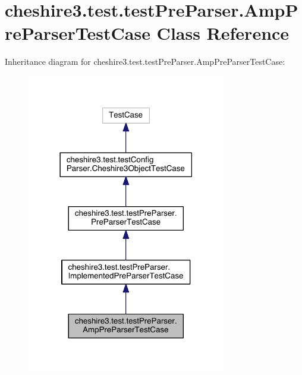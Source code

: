 \hypertarget{classcheshire3_1_1test_1_1test_pre_parser_1_1_amp_pre_parser_test_case}{\section{cheshire3.\-test.\-test\-Pre\-Parser.\-Amp\-Pre\-Parser\-Test\-Case Class Reference}
\label{classcheshire3_1_1test_1_1test_pre_parser_1_1_amp_pre_parser_test_case}
}


Inheritance diagram for cheshire3.\-test.\-test\-Pre\-Parser.\-Amp\-Pre\-Parser\-Test\-Case\-:
\nopagebreak
\begin{figure}[H]
\begin{center}
\leavevmode
\includegraphics[width=246pt]{classcheshire3_1_1test_1_1test_pre_parser_1_1_amp_pre_parser_test_case__inherit__graph}
\end{center}
\end{figure}


